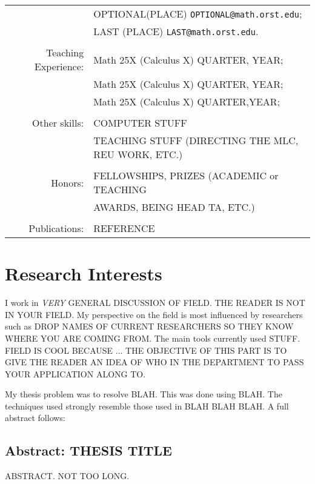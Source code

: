 \documentclass[11pt]{gthesis2}  %
\begin{document}
\begin{tabular}{rl}
            &OPTIONAL(PLACE) \texttt{OPTIONAL@math.orst.edu};\\
            &LAST (PLACE) \texttt{LAST@math.orst.edu}.\\
&\\
Teaching Experience:    &Math 25X (Calculus X) QUARTER, YEAR;\\
            &Math 25X (Calculus X)  QUARTER, YEAR;\\
            &Math 25X (Calculus X)  QUARTER,YEAR;\\
&\\
Other skills:   &COMPUTER STUFF\\
                &TEACHING STUFF (DIRECTING THE MLC, REU WORK, ETC.)\\
&\\
Honors:         &FELLOWSHIPS, PRIZES (ACADEMIC or TEACHING \\
&AWARDS, BEING HEAD TA, ETC.)\\
&\\
Publications:   &REFERENCE\\
\end{tabular}
%
%
%
%
%
\section*{Research Interests}

I work in {\em VERY} GENERAL DISCUSSION OF FIELD. THE READER IS
NOT IN YOUR FIELD. My perspective on the field is most influenced
by researchers such as DROP NAMES OF CURRENT RESEARCHERS SO THEY
KNOW WHERE YOU ARE COMING FROM. The main tools currently used
STUFF. FIELD IS COOL BECAUSE ... THE OBJECTIVE OF THIS PART IS TO
GIVE THE READER AN IDEA OF WHO IN THE DEPARTMENT TO PASS YOUR
APPLICATION ALONG TO.

My thesis problem was to resolve BLAH. This was done using BLAH.
The techniques used strongly resemble those used in BLAH BLAH
BLAH. A full abstract follows:
%
%
\subsection*{Abstract: THESIS TITLE}
%
ABSTRACT. NOT TOO LONG.
%
%
\end{document}

